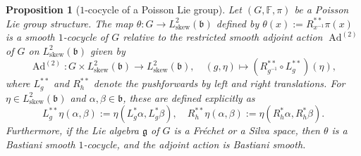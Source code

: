 \documentclass[11pt,reqno]{amsart}
\newtheorem{proposition}[theorem]{Proposition}
\theoremstyle{definition}
\numberwithin{equation}{section}
\begin{document}
\begin{proposition}[$1$-cocycle of a Poisson Lie group]\label{Poisson 1-cocycle}
Let $(G, \mathbb{F}, \pi)$ be a Poisson Lie group structure. The map $\theta: G \rightarrow L^2_{\text{skew}}(\mathfrak{b})$ defined by $\theta(x) := R_{x^{-1}}^{**}\pi(x)$ is a smooth $1$-cocycle of $G$ relative to the restricted smooth adjoint action $\operatorname{Ad}^{(2)}$ of $G$ on $L^2_{\text{skew}}(\mathfrak{b})$ given by
\[ 
\operatorname{Ad}^{(2)}: G \times L^2_{\text{skew}}(\mathfrak{b}) \rightarrow L^2_{\text{skew}}(\mathfrak{b}), \quad (g, \eta) \mapsto \left( R_{g^{-1}}^{**} \circ L_{g}^{**} \right)(\eta), 
\]
where $L_{g}^{**}$ and $R_{h}^{**}$ denote the pushforwards by left and right translations. For $\eta \in L^2_{\text{skew}}(\mathfrak{b})$ and $\alpha, \beta \in \mathfrak{b}$, these are defined explicitly as
\[ 
L_{g}^{**}\eta(\alpha, \beta) := \eta(L_{g}^*\alpha, L_{g}^*\beta), \quad R_{h}^{**}\eta(\alpha, \beta) := \eta(R_{h}^{*}\alpha, R_{h}^*\beta). 
\]
Furthermore, if the Lie algebra $\mathfrak{g}$ of $G$ is a Fréchet or a Silva space, then $\theta$ is a Bastiani smooth $1$-cocycle, and the adjoint action is Bastiani smooth.
\end{proposition}
\end{document}
